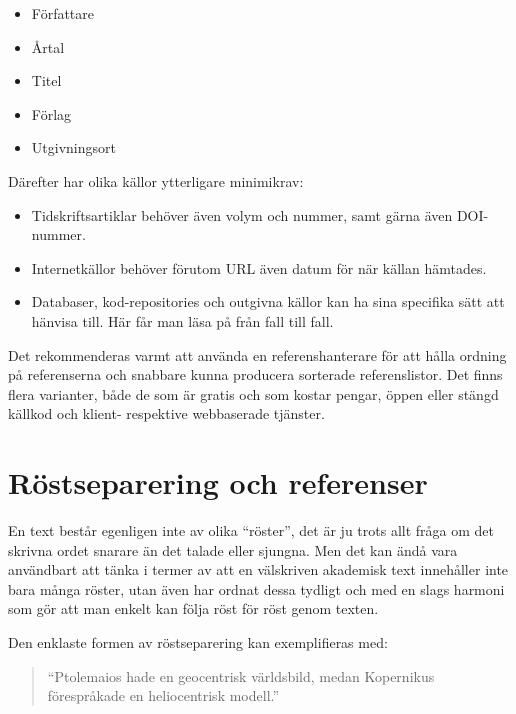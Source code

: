 \documentclass[11pt,a5paper,footinclude=true,headinclude=true]{scrbook} %
\begin{document}
{\begin{small}
\begin{itemize}
\item Författare
\item Årtal
\item Titel
\item Förlag
\item Utgivningsort
\end{itemize}
\end{small}

\noindent Därefter har olika källor ytterligare minimikrav:

\begin{small}
\begin{itemize}
\item Tidskriftsartiklar behöver även volym och nummer, samt gärna även DOI-nummer.
\item Internetkällor behöver förutom URL även datum för när källan hämtades.
\item  Databaser, kod-repositories och outgivna källor kan ha sina specifika sätt att hänvisa till. Här får man läsa på från fall till fall.
\end{itemize}
\end{small}

\noindent Det rekommenderas varmt att använda en referenshanterare för att hålla ordning på referenserna och snabbare kunna producera sorterade referenslistor. Det finns flera varianter, både de som är gratis och som kostar pengar, öppen eller stängd källkod och klient- respektive webbaserade tjänster. 

\section{Röstseparering och referenser}

En text består egenligen inte av olika ``röster'', det är ju trots allt fråga om det skrivna ordet snarare än det talade eller sjungna. Men det kan ändå vara användbart att tänka i termer av att en välskriven akademisk text innehåller inte bara många röster, utan även har ordnat dessa tydligt och med en slags harmoni som gör att man enkelt kan följa röst för röst genom texten. 

Den enklaste formen av röstseparering kan exemplifieras med:

\begin{quote}
``Ptolemaios hade en geocentrisk världsbild, medan Kopernikus förespråkade en heliocentrisk modell.''
\end{quote}

}
\end{document}
